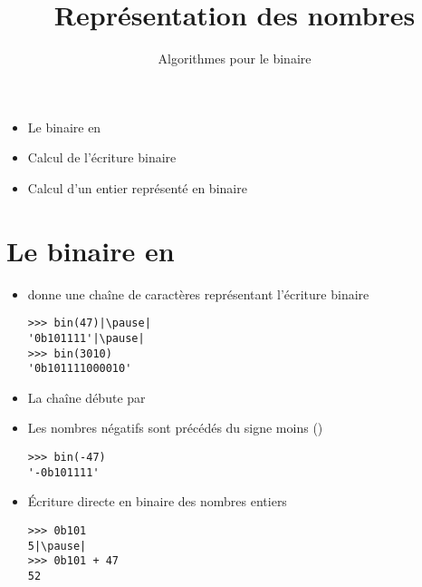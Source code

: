 \title{{\bf Représentation des nombres}}
\subtitle{Algorithmes pour le binaire}

\begin{frame}
  
  \debutmontitre

  \pause

{\footnotesize
\hfil\qquad\qquad\qquad\qquad
{}
\begin{minipage}{0.6\textwidth}
  \begin{itemize}
    \item<3-> Le binaire en \Python
    \item<4-> Calcul de l'écriture binaire
    \item<5-> Calcul d'un entier représenté en binaire
  \end{itemize}
\end{minipage}
}

\end{frame}

\setcounter{framenumber}{0}

\section{Le binaire en  \Python}



\begin{frame}[fragile]
  

\begin{itemize}
  \pause
  \item {} donne une chaîne de caractères représentant l'écriture binaire
  \pause
\begin{lstlisting}
>>> bin(47)|\pause|
'0b101111'|\pause|
>>> bin(3010)
'0b101111000010'  
\end{lstlisting}  

\pause
  \item La chaîne débute par 
\pause
  \item Les nombres négatifs sont précédés du signe moins (\codeinline{-})

\begin{lstlisting}
>>> bin(-47)
'-0b101111'  
\end{lstlisting}

\pause
  \item Écriture directe en binaire des nombres entiers
\begin{lstlisting}
>>> 0b101
5|\pause|
>>> 0b101 + 47
52  
\end{lstlisting}

\end{itemize}

\end{frame}


